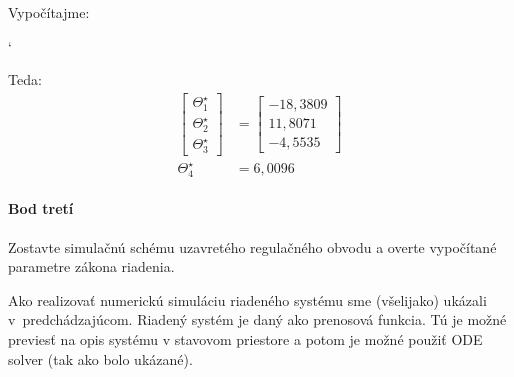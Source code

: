 \documentclass[a4paper, 10pt, ]{article}
\begin{document}
\noindent
Vypočítajme:
{\catcode`

}

\noindent
Teda:
\begin{subequations}
\begin{align}
	\begin{bmatrix}
    	  \Theta_1^\star \\
		  \Theta_2^\star \\
		  \Theta_3^\star
 	\end{bmatrix}
	&=
	\begin{bmatrix}
    	-18,3809 \\
    	11,8071 \\
    	-4,5535
  	\end{bmatrix} \\
	\Theta_4^\star &= 6,0096
\end{align}
\end{subequations}










\paragraph{Bod tretí}

\label{cast1bodtreti}

\smallskip

{\color{gray}

Zostavte simulačnú schému uzavretého regulačného obvodu a overte vypočítané parametre zákona riadenia.

}

\smallskip

\noindent
Ako realizovať numerickú simuláciu riadeného systému sme (všelijako) ukázali v~predchádzajúcom. Riadený systém je daný ako prenosová funkcia. Tú je možné previesť na opis systému v stavovom priestore a potom je možné použiť ODE solver (tak ako bolo ukázané).
\end{document}
